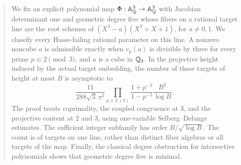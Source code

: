\begin{abstract}
We fix an explicit polynomial map \(\Phi:\A^3_\Q\to\A^3_\Q\) with
Jacobian determinant one and geometric degree five whose fibers on a
rational target line are the root schemes of
\((X^3-a)(X^2+X+1)\), for \(a\ne0,1\). We classify every Hasse-failing
rational parameter on this line. A nonzero noncube \(a\) is admissible
exactly when \(v_p(a)\) is divisible by three for every prime
\(p\equiv2\pmod3\), and \(a\) is a cube in \(\Q_3\).
In the projective height induced by the actual target embedding, the number
of these targets of height at most \(B\) is asymptotic to
\[
 \frac{11}{288\sqrt3\,\pi^2}
 \prod_{p\equiv2\ (3)}\frac{1+p^{-3}}{1-p^{-3}}
 \frac{B^2}{\log B}.
\]
The proof treats coprimality, the coupled congruence at \(3\), and the
projective content at \(2\) and \(3\), using one-variable
Selberg--Delange estimates. The sufficient integer subfamily has order
\(B/\sqrt{\log B}\). The count is of targets on one line, rather than
distinct fiber algebras or all targets of the map. Finally, the classical
degree obstruction for intersective polynomials shows that geometric
degree five is minimal.
\end{abstract}
